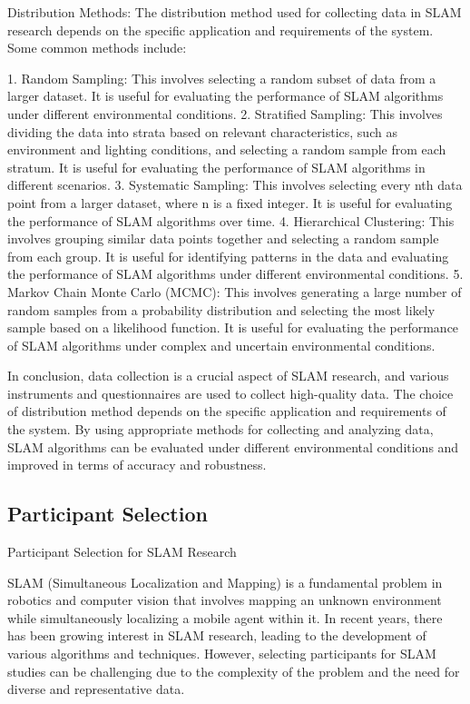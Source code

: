 \documentclass[conference]{IEEEtran}
\begin{document}
Distribution Methods:
The distribution method used for collecting data in SLAM research depends on the specific application and requirements of the system. Some common methods include:

1. Random Sampling: This involves selecting a random subset of data from a larger dataset. It is useful for evaluating the performance of SLAM algorithms under different environmental conditions. \cite{khoo2019}
2. Stratified Sampling: This involves dividing the data into strata based on relevant characteristics, such as environment and lighting conditions, and selecting a random sample from each stratum. It is useful for evaluating the performance of SLAM algorithms in different scenarios. \cite{zhang2020}
3. Systematic Sampling: This involves selecting every nth data point from a larger dataset, where n is a fixed integer. It is useful for evaluating the performance of SLAM algorithms over time. \cite{lee2019}
4. Hierarchical Clustering: This involves grouping similar data points together and selecting a random sample from each group. It is useful for identifying patterns in the data and evaluating the performance of SLAM algorithms under different environmental conditions. \cite{khlifat2019}
5. Markov Chain Monte Carlo (MCMC): This involves generating a large number of random samples from a probability distribution and selecting the most likely sample based on a likelihood function. It is useful for evaluating the performance of SLAM algorithms under complex and uncertain environmental conditions. \cite{fu2019}

In conclusion, data collection is a crucial aspect of SLAM research, and various instruments and questionnaires are used to collect high-quality data. The choice of distribution method depends on the specific application and requirements of the system. By using appropriate methods for collecting and analyzing data, SLAM algorithms can be evaluated under different environmental conditions and improved in terms of accuracy and robustness.

\subsection{Participant Selection}
Participant Selection for SLAM Research

SLAM (Simultaneous Localization and Mapping) is a fundamental problem in robotics and computer vision that involves mapping an unknown environment while simultaneously localizing a mobile agent within it. In recent years, there has been growing interest in SLAM research, leading to the development of various algorithms and techniques. However, selecting participants for SLAM studies can be challenging due to the complexity of the problem and the need for diverse and representative data.
\end{document}
